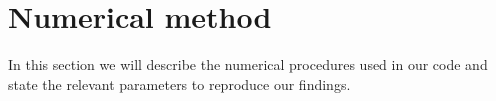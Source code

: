 \section{Numerical method}
In this section we will describe the numerical procedures used in our code and state the relevant parameters to reproduce our findings.



